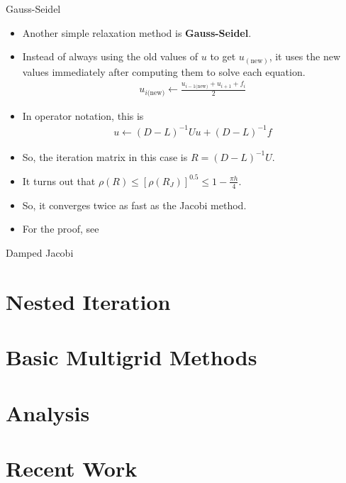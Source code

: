 \documentclass{beamer}
\begin{document}
\begin{frame}[label=gaussSeidel]{Gauss-Seidel}
 \begin{itemize}
  \item Another simple relaxation method is \textbf{Gauss-Seidel}.
  \item Instead of always using the old values of $u$ to get $u_(\text{new})$,
        it uses the new values immediately after computing them to solve each
        equation.
  \begin{align}
   u_{i\text{(new)}} \leftarrow \frac{u_{i-1\text{(new)}}+u_{i+1}+f_i}{2}
  \end{align}
  \item In operator notation, this is
  \begin{align}
   u \leftarrow (D-L)^{-1}Uu + (D-L)^{-1}f
  \end{align}
  \item So, the iteration matrix in this case is $R=(D-L)^{-1}U$.
  \item It turns out that $\rho(R) \leq \left[\rho(R_J)\right]^{0.5} \leq 1-\frac{\pi h}{4}$.
  \item So, it converges twice as fast as the Jacobi method.
  \item For the proof, see
        \hyperlink{gaussSeidelProof}{}
 \end{itemize}
\end{frame}

\begin{frame}[allowframebreaks]{Damped Jacobi}
 
\end{frame}

\section{Nested Iteration}%

\section{Basic Multigrid Methods}%

\section{Analysis}%

\section{Recent Work}%
\end{document}
